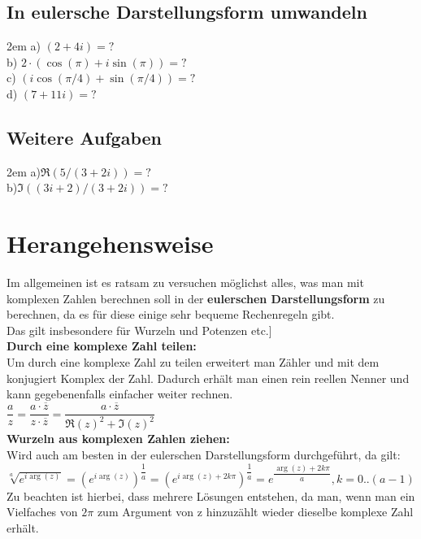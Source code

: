 \documentclass[11pt,final]{scrreprt}
\newcommand{\br} {\medskip\\}
\begin{document}
\subsection{In eulersche Darstellungsform umwandeln}
\begingroup
\leftskip2em 
a) $(2+4i) = ?$\\
b) $ 2\cdot(\cos(\pi)+i\sin(\pi)) = ?$ \\
c) $(i\cos(\pi/4)+\sin(\pi/4))= ? $\\
d) $(7+11i) = ?$
\par	
\endgroup 
\subsection{Weitere Aufgaben}
\begingroup
\leftskip2em 
a)$\Re(5 / (3+2i)) = ?  $\\
b)$\Im((3i+2) / (3+2i)) = ?  $
\par	
\endgroup 

\section{Herangehensweise}

Im allgemeinen ist es ratsam zu versuchen möglichst alles, was man mit komplexen Zahlen berechnen soll in der \textbf{eulerschen Darstellungsform} zu berechnen, da es für diese einige sehr bequeme Rechenregeln gibt.\\
\text{[}Das gilt insbesondere für Wurzeln und Potenzen etc.]\br

\textbf{Durch eine komplexe Zahl teilen:} \\
Um durch eine komplexe Zahl zu teilen erweitert man Zähler und mit dem konjugiert Komplex der Zahl. Dadurch erhält man einen rein reellen Nenner und kann gegebenenfalls einfacher weiter rechnen.\\
$ \dfrac{a}{z} = \dfrac{a\cdot\overline{z}}{z\cdot\overline{z}}=\dfrac{a\cdot\overline{z}}{\Re(z)^2+\Im(z)^2} $\br

\textbf{Wurzeln aus komplexen Zahlen ziehen:}\\
Wird auch am besten in der eulerschen Darstellungsform durchgeführt, da gilt:\\
$\sqrt[a]{e^{i\arg(z)}} = (e^{i\arg(z)})^{\dfrac{1}{a}} = (e^{i\arg(z)+2k\pi})^{\dfrac{1}{a}} = e^{\dfrac{\arg(z)+2k\pi}{a}}, k=0..(a-1)$\\
Zu beachten ist hierbei, dass mehrere Lösungen entstehen, da man, wenn man ein Vielfaches von $2\pi$ zum Argument von z hinzuzählt wieder dieselbe komplexe Zahl erhält.
\end{document}
